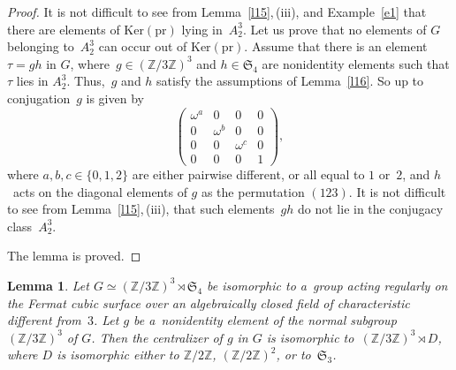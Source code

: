 \documentclass{amsart}
\numberwithin{equation}{section}
\theoremstyle{plain}
\newtheorem{lemma}{Lemma}
\theoremstyle{definition}
\theoremstyle{remark}
\begin{document}
\begin{proof}
It is not difficult to see from Lemma~\ref{l15},\,(iii), and Example~\ref{e1} that there are elements of $\mathrm{Ker}(\mathrm{pr})$ lying in~$A_2^3$. Let us prove that no elements of $G$ belonging to~$A_2^3$ can occur out of $\mathrm{Ker}(\mathrm{pr})$. Assume that there is an element $\tau=gh$ in $G$, where~\mbox{$g \in (\mathbb{Z}/3\mathbb{Z})^3$} and $h \in \mathfrak{S}_4$ are nonidentity elements such that $\tau$ lies in $A_2^3$. Thus,~$g$ and $h$ satisfy the assumptions of Lemma~\ref{l16}. So up to conjugation~$g$ is given by
$$
\begin{pmatrix}
\omega^a & 0 & 0 & 0\\
0 & \omega^b & 0 & 0\\
0 & 0 & \omega^c & 0\\
0 & 0 & 0 & 1
\end{pmatrix},
$$
where $a,b,c \in \{0,1,2\}$ are either pairwise different, or all equal to $1$ or~$2$, and $h$~acts on the diagonal elements of $g$ as the permutation $(123)$. It is not difficult to see from Lemma~\ref{l15},\,(iii), that such elements~$gh$ do not lie in the conjugacy class~$A_2^3$.

The lemma is proved.
\end{proof}

\begin{lemma}
\label{l18}
Let $G \simeq (\mathbb{Z}/3\mathbb{Z})^3 \rtimes \mathfrak{S}_4$ be isomorphic to a~group acting regularly on the Fermat cubic surface over an algebraically closed field of characteristic different from~$3$. Let $g$ be a~nonidentity element of the normal subgroup~$(\mathbb{Z}/3\mathbb{Z})^3$ of $G$. Then the centralizer of $g$ in $G$ is isomorphic to~$(\mathbb{Z}/3\mathbb{Z})^3 \rtimes D$, where $D$ is isomorphic either to $\mathbb{Z}/2\mathbb{Z}$, $(\mathbb{Z}/2\mathbb{Z})^2$, or to~$\mathfrak{S}_3$.
\end{lemma}
\end{document}
